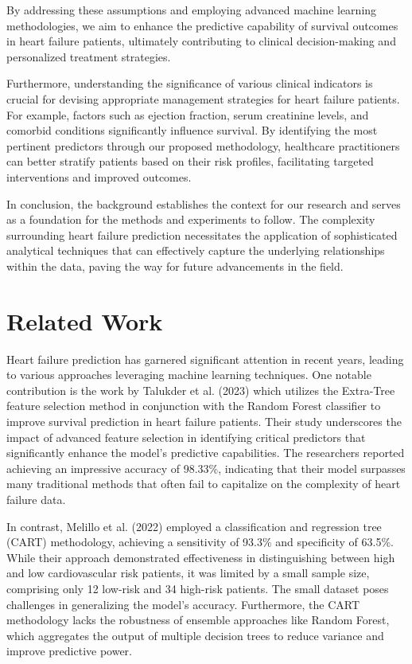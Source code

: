 \documentclass{article}
\begin{document}
By addressing these assumptions and employing advanced machine learning methodologies, we aim to enhance the predictive capability of survival outcomes in heart failure patients, ultimately contributing to clinical decision-making and personalized treatment strategies.

Furthermore, understanding the significance of various clinical indicators is crucial for devising appropriate management strategies for heart failure patients. For example, factors such as ejection fraction, serum creatinine levels, and comorbid conditions significantly influence survival. By identifying the most pertinent predictors through our proposed methodology, healthcare practitioners can better stratify patients based on their risk profiles, facilitating targeted interventions and improved outcomes.

In conclusion, the background establishes the context for our research and serves as a foundation for the methods and experiments to follow. The complexity surrounding heart failure prediction necessitates the application of sophisticated analytical techniques that can effectively capture the underlying relationships within the data, paving the way for future advancements in the field.

\section{Related Work}
Heart failure prediction has garnered significant attention in recent years, leading to various approaches leveraging machine learning techniques. One notable contribution is the work by Talukder et al. (2023) which utilizes the Extra-Tree feature selection method in conjunction with the Random Forest classifier to improve survival prediction in heart failure patients. Their study underscores the impact of advanced feature selection in identifying critical predictors that significantly enhance the model's predictive capabilities. The researchers reported achieving an impressive accuracy of 98.33\%, indicating that their model surpasses many traditional methods that often fail to capitalize on the complexity of heart failure data.

In contrast, Melillo et al. (2022) employed a classification and regression tree (CART) methodology, achieving a sensitivity of 93.3\% and specificity of 63.5\%. While their approach demonstrated effectiveness in distinguishing between high and low cardiovascular risk patients, it was limited by a small sample size, comprising only 12 low-risk and 34 high-risk patients. The small dataset poses challenges in generalizing the model's accuracy. Furthermore, the CART methodology lacks the robustness of ensemble approaches like Random Forest, which aggregates the output of multiple decision trees to reduce variance and improve predictive power.
\end{document}
